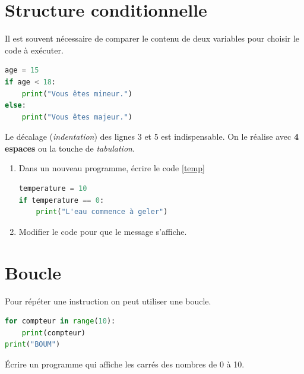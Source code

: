 \documentclass[a4paper,11pt]{article}
\begin{document}
\begin{Form}
\section{Structure conditionnelle}
Il est souvent nécessaire de comparer le contenu de deux variables pour choisir le code à exécuter.
\begin{center}
\begin{lstlisting}[language=Python]
age = 15
if age < 18:
    print("Vous êtes mineur.")
else:
    print("Vous êtes majeur.")
\end{lstlisting}
\label{majorite}
\end{center}
\begin{aretenir}[]
Le décalage (\emph{indentation}) des lignes 3 et 5 est indispensable. On le réalise avec \textbf{4 espaces} ou la touche de \emph{tabulation}.
\end{aretenir}
\begin{activite}
\begin{enumerate}
\item Dans un nouveau programme, écrire le code \ref{temp}
\begin{center}
\begin{lstlisting}[language=Python]
temperature = 10
if temperature == 0:
    print("L'eau commence à geler")
\end{lstlisting}
\label{temp}
\end{center}
\item Modifier le code pour que le message s'affiche.
\end{enumerate}
\end{activite}
\section{Boucle}
Pour répéter une instruction on peut utiliser une boucle.
\begin{center}
\begin{lstlisting}[language=Python]
for compteur in range(10):
    print(compteur)
print("BOUM")
\end{lstlisting}
\label{moncode}
\end{center}
\begin{activite}
Écrire un programme qui affiche les carrés des nombres de 0 à 10.
\end{activite}
\end{Form}
\end{document}
